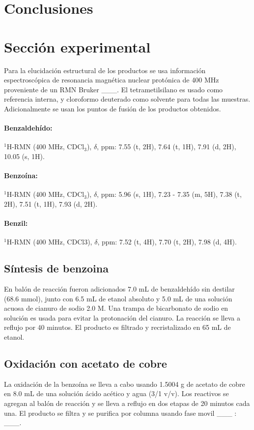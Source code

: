 \documentclass[fleqn,10pt]{SelfArx}
\begin{document}
\section{Conclusiones}
\section{Secci\'on experimental}
Para la elucidaci\'on estructural de los productos se usa informaci\'on espectrosc\'opica de resonancia magn\'etica nuclear prot\'onica de 400 MHz proveniente de un RMN Bruker \_\_\_. El tetrametilsilano es usado como referencia interna, y cloroformo deuterado como solvente para todas las muestras. Adicionalmente se usan los puntos de fusi\'on de los productos obtenidos.
\paragraph{Benzaldehído:} $^1$H-RMN (400 MHz, CDCl$_3$), $\delta$, ppm: 7.55 (t, 2H), 7.64 (t, 1H), 7.91 (d, 2H), 10.05 (s, 1H).

\paragraph{Benzo\'ina:} $^1$H-RMN (400 MHz, CDCl$_3$), $\delta$, ppm: 5.96 (s, 1H), 7.23 - 7.35 (m, 5H), 7.38 (t, 2H), 7.51 (t, 1H), 7.93 (d, 2H).

\paragraph{Benzil:} $^1$H-RMN (400 MHz, CDCl3), $\delta$, ppm: 7.52 (t, 4H), 7.70 (t, 2H), 7.98 (d, 4H). 

\subsection{S\'intesis de benzoina}
En bal\'on de reacci\'on fueron adicionados 7.0 mL de benzaldeh\'ido sin destilar (68.6 mmol), junto con 6.5 mL de etanol absoluto y 5.0 mL de una soluci\'on acuosa de cianuro de sodio 2.0 M. Una trampa de bicarbonato de sodio en soluci\'on es usada para evitar la protonaci\'on del cianuro. La reacci\'on se lleva a reflujo por 40 minutos. El producto es filtrado y recristalizado en 65 mL de etanol.


\subsection{Oxidaci\'on con acetato de cobre}
La oxidaci\'on de la benzo\'ina se lleva a cabo usando 1.5004 g de acetato de cobre en 8.0 mL de una soluci\'on \'acido ac\'etico y agua (3/1 v/v). Los reactivos se agregan al bal\'on de reacci\'on y se lleva a reflujo en dos etapas de 20 minutos cada una. El producto se filtra y se purifica por columna usando fase movil \_\_\_ : \_\_\_.
\end{document}
